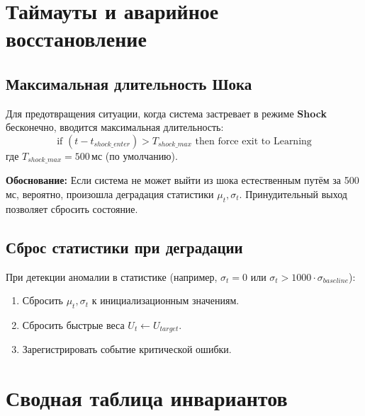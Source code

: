\section{Таймауты и аварийное восстановление}

\subsection{Максимальная длительность Шока}

Для предотвращения ситуации, когда система застревает в режиме \textbf{Shock} бесконечно, вводится максимальная длительность:
\begin{equation}
\text{if } (t - t_{shock\_enter}) > T_{shock\_max} \text{ then force exit to Learning}
\label{eq:shock_timeout}
\end{equation}
где $T_{shock\_max} = 500 \, \text{мс}$ (по умолчанию).

\textbf{Обоснование:} Если система не может выйти из шока естественным путём за 500 мс, вероятно, произошла деградация статистики $\mu_t, \sigma_t$. Принудительный выход позволяет сбросить состояние.

\subsection{Сброс статистики при деградации}

При детекции аномалии в статистике (например, $\sigma_t = 0$ или $\sigma_t > 1000 \cdot \sigma_{baseline}$):
\begin{enumerate}
    \item Сбросить $\mu_t, \sigma_t$ к инициализационным значениям.
    \item Сбросить быстрые веса $U_t \leftarrow U_{target}$.
    \item Зарегистрировать событие критической ошибки.
\end{enumerate}

\section{Сводная таблица инвариантов}


